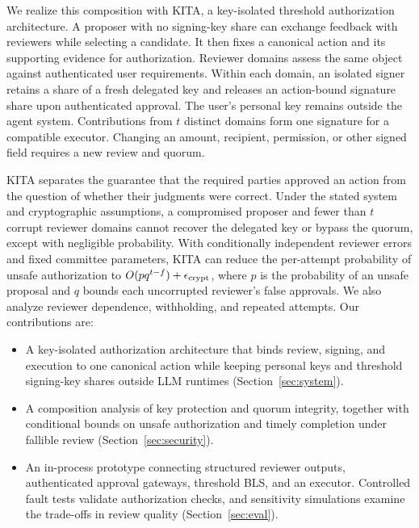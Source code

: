 \documentclass{article}
\begin{document}
We realize this composition with \textsf{KITA}, a key-isolated threshold
authorization architecture. A proposer with no signing-key share can exchange
feedback with reviewers while selecting a candidate. It then fixes a canonical
action and its supporting evidence for authorization. Reviewer domains assess
the same object against authenticated user requirements. Within each domain,
an isolated signer retains a share of a fresh delegated key and releases an
action-bound signature share upon authenticated approval. The user's
personal key remains outside the agent system. Contributions from $t$
distinct domains form one signature for a compatible executor. Changing an
amount, recipient, permission, or other signed field requires a new review
and quorum.

\textsf{KITA} separates the guarantee that the required parties approved an action
from the question of whether their judgments were correct. Under the stated
system and cryptographic assumptions, a compromised proposer and fewer than
$t$ corrupt reviewer domains cannot recover the delegated key or bypass the
quorum, except with negligible probability. With conditionally independent
reviewer errors and fixed committee parameters, \textsf{KITA} can reduce the per-attempt
probability of unsafe authorization to $O(pq^{t-f})+\epsilon_{\rm crypt}$,
where $p$ is the probability of an unsafe proposal and $q$ bounds each
uncorrupted reviewer's false approvals. We also
analyze reviewer dependence, withholding, and repeated attempts. Our contributions are:
\begin{itemize}[leftmargin=1.5em,itemsep=3pt,topsep=3pt]
  \item A key-isolated authorization architecture that binds review, signing,
  and execution to one canonical action while keeping personal keys and
  threshold signing-key shares outside LLM runtimes
  (Section~\ref{sec:system}).
  \item A composition analysis of key protection and quorum integrity,
  together with conditional bounds on unsafe authorization and timely
  completion under fallible review (Section~\ref{sec:security}).
  \item An in-process prototype connecting structured reviewer outputs,
  authenticated approval gateways, threshold BLS, and an executor.
  Controlled fault tests validate authorization checks, and sensitivity
  simulations examine the trade-offs in review quality
  (Section~\ref{sec:eval}).
\end{itemize}
\end{document}
